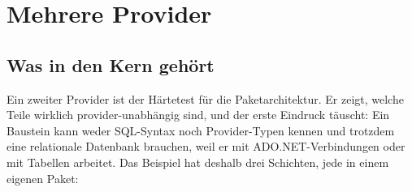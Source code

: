 \part{Mehrere Provider}\label{part:providers}

\chapter{Was in den Kern gehört}\label{ch:what-belongs-in-the-core}

Ein zweiter Provider ist der Härtetest für die Paketarchitektur. Er zeigt, welche Teile
wirklich provider-unabhängig sind, und der erste Eindruck täuscht: Ein Baustein kann weder
SQL-Syntax noch Provider-Typen kennen und trotzdem eine relationale Datenbank brauchen, weil er
mit ADO.NET-Verbindungen oder mit Tabellen arbeitet. Das Beispiel hat deshalb drei Schichten,
jede in einem eigenen Paket:

